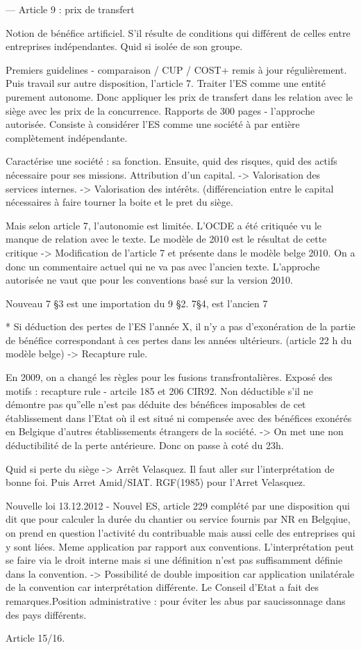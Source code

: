 \documentclass{book}
\begin{document}
---
Article 9 : prix de transfert

Notion de bénéfice artificiel. S'il résulte de conditions qui différent de celles entre entreprises indépendantes. Quid si isolée de son groupe.

Premiers guidelines - comparaison / CUP / COST+ remis à jour régulièrement. Puis travail sur autre disposition, l'article 7. Traiter l'ES comme une entité purement autonome. Donc appliquer les prix de transfert dans les relation avec le siège avec les prix de la concurrence. Rapports de 300 pages - l'approche autorisée. Consiste à considérer l'ES comme une société à par entière complètement indépendante.

Caractérise une société : sa fonction. Ensuite, quid des risques, quid des actifs nécessaire pour ses missions. Attribution d'un capital.
-> Valorisation des services internes.
-> Valorisation des intérêts. (différenciation entre le capital nécessaires à faire tourner la boite et le pret du siège.

Mais selon article 7, l'autonomie est limitée. L'OCDE a été critiquée vu le manque de relation avec le texte. Le modèle de 2010 est le résultat de cette critique -> Modification de l'article 7 et présente dans le modèle belge 2010. On a donc un commentaire actuel qui ne va pas avec l'ancien texte. L'approche autorisée ne vaut que pour les conventions basé sur la version 2010.

Nouveau 7 §3 est une importation du 9 §2. 7§4, est l'ancien 7 


* Si déduction des pertes de l'ES l'année X, il n'y a pas d'exonération de la partie de bénéfice correspondant à ces pertes dans les années ultérieurs. (article 22 h du modèle belge) -> Recapture rule.

En 2009, on a changé les règles pour les fusions transfrontalières. Exposé des motifs : recapture rule - artcile 185 et 206 CIR92. Non déductible s'il ne démontre pas qu''elle n'est pas déduite des bénéfices imposables de cet établissement dans l'Etat où il est situé ni compensée avec des bénéfices exonérés en Belgique d'autres établissements étrangers de la société. -> On met une non déductibilité de la perte antérieure. Donc on passe à coté du 23h.


Quid si perte du siège -> Arrêt Velasquez. Il faut aller sur l'interprétation de bonne foi. Puis Arret Amid/SIAT. RGF(1985) pour l'Arret Velasquez.

Nouvelle loi 13.12.2012 - Nouvel ES, article 229 complété par une disposition qui dit que pour calculer la durée du chantier ou service fournis par NR en Belgqiue, on prend en question l'activité du contribuable mais aussi celle des entreprises qui y sont liées. Meme application par rapport aux conventions. L'interprétation peut se faire via le droit interne mais si une définition n'est pas suffisamment définie dans la convention. -> Possibilité de double imposition car application unilatérale de la convention car interprétation différente. Le Conseil d'Etat a fait des remarques.Position administrative : pour éviter les abus par saucissonnage dans des pays différents.

Article 15/16.





\nocite{*}

\end{document}
